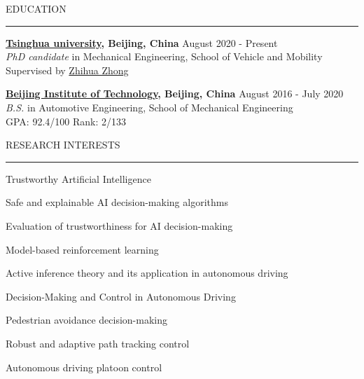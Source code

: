 \documentclass{resume} %
\renewenvironment{rSection}[1]{
\sectionskip
\textcolor{TsinghuaPurple}{\MakeUppercase{#1}}
\sectionlineskip
\hrule
\begin{list}{}{
\setlength{\leftmargin}{0em}
}
\item[]
}{
\end{list}
}
\begin{document}
  


\begin{rSection}{Education}

{\bf \href{https://www.tsinghua.edu.cn/en/}{Tsinghua university}, Beijing, China} \hfill {August 2020 - Present}
\\ 
\textit{PhD candidate} in Mechanical Engineering, School of Vehicle and Mobility
\\
Supervised by \href{https://en.wikipedia.org/wiki/Zhong_Zhihua}{Zhihua Zhong} 

{\bf \href{https://english.bit.edu.cn/}{Beijing Institute of Technology}, Beijing, China} \hfill {August 2016 - July 2020}
\\ 
\textit{B.S.} in Automotive Engineering, School of Mechanical Engineering
\\
GPA: 92.4/100 Rank: 2/133



\end{rSection} 


\begin{rSection}{Research INTERESTS}

\begin{rSubsection}{Trustworthy Artificial Intelligence}{}{}

\item Safe and explainable AI decision-making algorithms
\item Evaluation of trustworthiness for AI decision-making
\item Model-based reinforcement learning 
\item Active inference theory and its application in autonomous driving
\end{rSubsection}  

\begin{rSubsection}{Decision-Making and Control in Autonomous Driving}{}{}

\item Pedestrian avoidance decision-making
\item Robust and adaptive path tracking control  
\item Autonomous driving platoon control
\end{rSubsection}  


\end{rSection}
\end{document}
